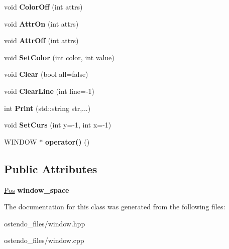 \begin{DoxyCompactItemize}
void {\bfseries Color\+Off} (int attrs)
\item 
\mbox{\label{classostendo_1_1Window_ab91a9f66a8f05e9349905ec9b1623de4}} 
void {\bfseries Attr\+On} (int attrs)
\item 
\mbox{\label{classostendo_1_1Window_aa2e4c33da0d446f52e7c34d1ec781bbc}} 
void {\bfseries Attr\+Off} (int attrs)
\item 
\mbox{\label{classostendo_1_1Window_adde21c9878a3d8dd0d94ae68d58040cb}} 
void {\bfseries Set\+Color} (int color, int value)
\item 
\mbox{\label{classostendo_1_1Window_ae4c005e63e6b15c5e9b940025a80b90d}} 
void {\bfseries Clear} (bool all=false)
\item 
\mbox{\label{classostendo_1_1Window_abaa3685e5937a29aabd7acf078b789c1}} 
void {\bfseries Clear\+Line} (int line=-\/1)
\item 
\mbox{\label{classostendo_1_1Window_a1781807aea1eb5dedc9f2885e41fcd2b}} 
int {\bfseries Print} (std\+::string str,...)
\item 
\mbox{\label{classostendo_1_1Window_a4e6839482997c00795f3c4191d80b3c4}} 
void {\bfseries Set\+Curs} (int y=-\/1, int x=-\/1)
\item 
\mbox{\label{classostendo_1_1Window_a4a67da930b3dda1951fef1d506d83980}} 
W\+I\+N\+D\+OW $\ast$ {\bfseries operator()} ()
\end{DoxyCompactItemize}
\subsection*{Public Attributes}
\begin{DoxyCompactItemize}
\item 
\mbox{\label{classostendo_1_1Window_a17ba58f5d7098c05f56550db36b64a9b}} 
\hyperlink{structostendo_1_1Pos}{Pos} {\bfseries window\+\_\+space}
\end{DoxyCompactItemize}


The documentation for this class was generated from the following files\+:\begin{DoxyCompactItemize}
\item 
ostendo\+\_\+files/window.\+hpp\item 
ostendo\+\_\+files/window.\+cpp\end{DoxyCompactItemize}
